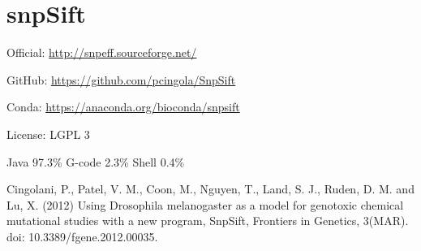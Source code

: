 \documentclass[]{article}
\begin{document}
\section{snpSift}

Official: \url{http://snpeff.sourceforge.net/}

GitHub: \url{https://github.com/pcingola/SnpSift}

Conda: \url{https://anaconda.org/bioconda/snpsift}

License: LGPL 3

Java 97.3\% G-code 2.3\% Shell 0.4\%



Cingolani, P., Patel, V. M., Coon, M., Nguyen, T., Land, S. J., Ruden, D. M. and Lu, X. (2012) Using Drosophila melanogaster as a model for genotoxic chemical mutational studies with a new program, SnpSift, Frontiers in Genetics, 3(MAR). doi: 10.3389/fgene.2012.00035.
\end{document}
